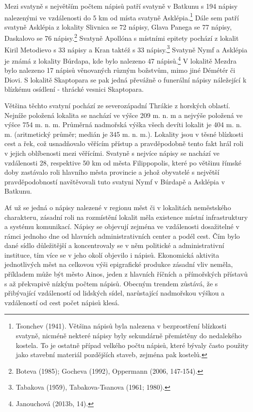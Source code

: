 Mezi svatyně s největším počtem nápisů patří svatyně v Batkunu s 194 nápisy nalezenými ve vzdálenosti do 5 km od místa svatyně Asklépia.\footnote{Tsonchev (1941). Většina nápisů byla nalezena v bezprostření blízkosti svatyně, nicméně nekteré nápisy byly sekundárně přemístěny do nedalekého kostela. To je ostatně případ velkého počtu nápisů, které bývaly často použity jako stavební materiál pozdějších staveb, zejména pak kostelů.} Dále sem patří svatyně Asklépia z lokality Slivnica se 72 nápisy, Glava Panega se 77 nápisy, Daskalovo se 76 nápisy.\footnote{Boteva (1985); Gocheva (1992), Oppermann (2006, 147-154).} Svatyně Apollóna s místními epitety pochází z lokalit Kiril Metodievo s 33 nápisy a Kran taktéž s 33 nápisy.\footnote{Tabakova (1959), Tabakova-Tsanova (1961; 1980).} Svatyně Nymf a Asklépia je známá z lokality Búrdapa, kde bylo nalezeno 47 nápisů.\footnote{Janouchová (2013b, 14).} V lokalitě Mezdra bylo nalezeno 17 nápisů věnovaných různým božstvům, mimo jiné Démétér či Diovi. S lokalitě Skaptopara se pak jedná převážně o funerální nápisy náležející k blízkému osídlení - thrácké vesnici Skaptopara.

Většina těchto svatyní pochází ze severozápadní Thrákie z horských oblastí. Nejníže položená lokalita se nachází ve výšce 209 m. n. m a nejvýše položená ve výšce 754 m. n. m. Průměrná nadmořská výška všech devíti lokalit je 404 m. n. m. (aritmetický průměr; medián je 345 m. n. m.). Lokality jsou v těsné blízkosti cest a řek, což usnadňovalo věřícím přístup a pravděpodobně tento fakt hrál roli v jejich oblíbenosti mezi věřícími. Svatyně s nejvíce nápisy se nachází ve vzdálenosti 28, respektive 50 km od města Filippopolis, které po většinu římské doby zastávalo roli hlavního města provincie a jehož obyvatelé s největší pravděpodobností navštěvovali tuto svatyni Nymf v Búrdapě a Asklépia v Batkunu.

Ať už se jedná o nápisy nalezené v regionu měst či v lokalitách neměstského charakteru, zásadní roli na rozmístění lokalit měla existence místní infrastruktury a systému komunikací. Nápisy se objevují zejména ve vzdálenosti dosažitelné v rámci jednoho dne od hlavních administrativních center a podél cest. Čím bylo dané sídlo důležitější a koncentrovaly se v něm politické a administrativní instituce, tím více se v jeho okolí objevilo i nápisů. Ekonomická aktivita jednotlivých měst na celkovou výši epigrafické produkce zásadní vliv neměla, příkladem může být město Ainos, jeden z hlavních říčních a přímořských přístavů s až překvapivě nízkým počtem nápisů. Obecným trendem zůstává, že s přibývající vzdáleností od lidských sídel, narůstající nadmořskou výškou a vzdáleností od cest počet nápisů klesá.

